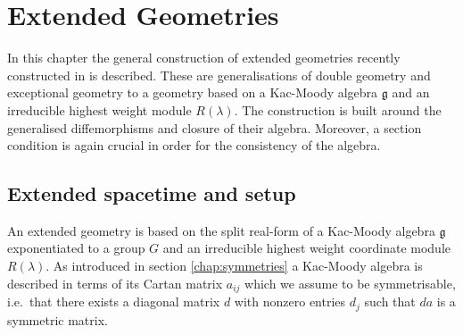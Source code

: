 \chapter{Extended Geometries}\label{chap:ExtendedGeometries}
In this chapter the general construction of extended geometries recently constructed in \cite{CederwallPalmkvist2017} is described. These are generalisations of double geometry and exceptional geometry to a geometry based on a Kac-Moody algebra $\mathfrak{g}$ and an irreducible highest weight module $R(\lambda)$. The construction is built around the generalised diffemorphisms and closure of their algebra. Moreover, a section condition is again crucial in order for the consistency of the algebra. 

\section{Extended spacetime and setup}
An extended geometry is based on the split real-form of a Kac-Moody algebra $\mathfrak{g}$ exponentiated to a group $G$ and an irreducible highest weight coordinate module $R(\lambda)$. As introduced in section \ref{chap:symmetries} a Kac-Moody algebra is described in terms of its Cartan matrix $a_{ij}$ which we assume to be symmetrisable, i.e.\ that there exists a diagonal matrix $d$ with nonzero entries $d_j$ such that $da$ is a symmetric matrix. 

